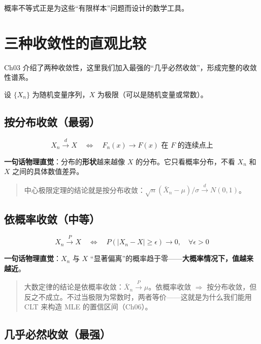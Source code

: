 \documentclass[
]{book}
\begin{document}
概率不等式正是为这些``有限样本''问题而设计的数学工具。

\section{三种收敛性的直观比较}\label{ux4e09ux79cdux6536ux655bux6027ux7684ux76f4ux89c2ux6bd4ux8f83}

Ch03 介绍了两种收敛性，这里我们加入最强的``几乎必然收敛''，形成完整的收敛性谱系。

设 \(\{X_n\}\) 为随机变量序列，\(X\) 为极限（可以是随机变量或常数）。

\subsection{按分布收敛（最弱）}\label{ux6309ux5206ux5e03ux6536ux655bux6700ux5f31}

\[X_n \xrightarrow{d} X \quad \Leftrightarrow \quad F_n(x) \to F(x) \text{ 在 } F \text{ 的连续点上}\]

\textbf{一句话物理直觉}：分布的\textbf{形状}越来越像 \(X\) 的分布。它只看概率分布，不看 \(X_n\) 和 \(X\) 之间的具体数值差异。

\begin{quote}
中心极限定理的结论就是按分布收敛：\(\sqrt{n}(\bar{X}_n - \mu)/\sigma \xrightarrow{d} N(0,1)\)。
\end{quote}

\subsection{依概率收敛（中等）}\label{ux4f9dux6982ux7387ux6536ux655bux4e2dux7b49}

\[X_n \xrightarrow{P} X \quad \Leftrightarrow \quad P(|X_n - X| \geq \epsilon) \to 0, \quad \forall \epsilon > 0\]

\textbf{一句话物理直觉}：\(X_n\) 与 \(X\) ``显著偏离''的概率趋于零------\textbf{大概率情况下，值越来越近}。

\begin{quote}
大数定律的结论是依概率收敛：\(\bar{X}_n \xrightarrow{P} \mu\)。依概率收敛 \(\Rightarrow\) 按分布收敛，但反之不成立。不过当极限为常数时，两者等价------这就是为什么我们能用 CLT 来构造 MLE 的置信区间（Ch06）。
\end{quote}

\subsection{几乎必然收敛（最强）}\label{ux51e0ux4e4eux5fc5ux7136ux6536ux655bux6700ux5f3a}
\end{document}
